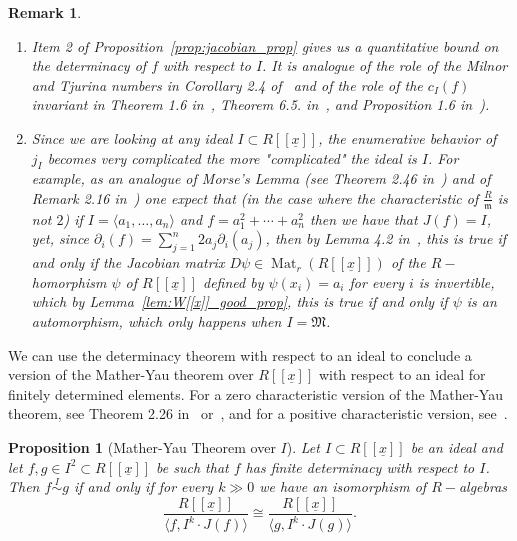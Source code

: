 \documentclass{article}
\newtheorem{proposition}[theorem]{Proposition}
\newtheorem{remark}[theorem]{Remark}
\DeclareMathOperator{\Mat}{Mat}
\newcommand{\equivd}{\overset{I}{\sim}}
\numberwithin{theorem}{section}
\begin{document}
\begin{remark}
\begin{enumerate}
    \item \textup{Item 2 of Proposition~\ref{prop:jacobian_prop} gives us a quantitative bound on the determinacy of $f$ with respect to $I$. It is analogue of the role of the Milnor and Tjurina numbers in Corollary 2.4 of~\cite{boubakri2012invariants} and of the role of the $c_I(f)$ invariant in Theorem 1.6 in~\cite{de1988some}, Theorem 6.5. in~\cite{pellikaan1988finite}, and Proposition 1.6 in~\cite{siersma1983isolated}). }
    \item  \textup{Since we are looking at any ideal $I \subset R[[\underline{x}]]$, the enumerative behavior of $j_I$ becomes very complicated the more "complicated" the ideal is $I$. For example, as an analogue of Morse's Lemma (see Theorem 2.46 in~\cite{greuel2007introduction}) and of Remark 2.16 in~\cite{pellikaan1990deformations}) one expect that (in the case where the characteristic of $\frac{R}{\mathfrak{m}}$ is not $2$) if $I=\langle a_1, \dots, a_n \rangle$ and $f=a_1^2 +\cdots +a_n^2$ then we have that $J(f)=I$, yet, since $\partial_i(f)=\sum_{j=1}^n 2a_j \partial_i(a_j)$, then by Lemma 4.2 in~\cite{greuel2019finite}, this is true if and only if the Jacobian matrix $D\psi \in \Mat_r(R[[\underline{x}]])$ of the $R-$homorphism $\psi$ of $R[[\underline{x}]]$ defined by $\psi(x_i)=a_i$ for every $i$ is invertible, which by Lemma~\ref{lem:W[[x]]_good_prop}, this is true if and only if $\psi$ is an automorphism, which only happens when $I=\mathfrak{M}$.}
\end{enumerate}
\end{remark}



We can use the determinacy theorem with respect to an ideal to conclude a version of the Mather-Yau theorem over $R[[\underline{x}]]$ with respect to an ideal for finitely determined elements. For a zero characteristic version of the Mather-Yau theorem, see Theorem 2.26 in~\cite{greuel2007introduction} or~\cite{mather1982classification}, and for a positive characteristic version, see~\cite{greuel2013mather}. 

\begin{proposition}[Mather-Yau Theorem over $I$]\label{prop:mather-yau}
    Let $I \subset R[[\underline{x}]]$ be an ideal and let $f, g \in I^2 \subset R[[\underline{x}]]$ be such that $f$ has finite determinacy with respect to $I$. Then $f \equivd g$ if and only if for every $k\gg 0$ we have an isomorphism of $R-$algebras
    \begin{equation*}
        \frac{R[[\underline{x}]]}{\langle f, I^k\cdot  J(f) \rangle} \cong \frac{R[[\underline{x}]]}{\langle g, I^k\cdot  J(g)\rangle}.
    \end{equation*}
\end{proposition}
\end{document}
